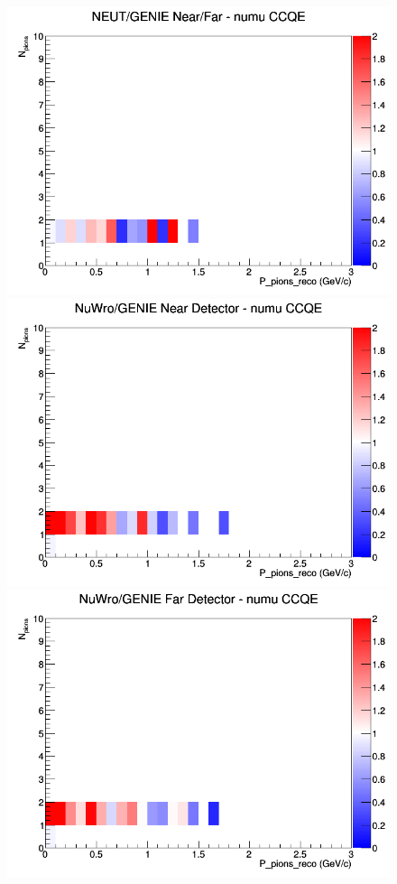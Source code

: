 \documentclass[12pt]{article}
\begin{document}
\begin{figure}[h]
\endminipage
{}
\includegraphics[width=\linewidth]{eff_N_P/GAr/pions/ratios/CCQE_NEUT_GENIE_numu_NF_N_P.png}
\endminipage
\newline
{}
\includegraphics[width=\linewidth]{eff_N_P/GAr/pions/ratios/CCQE_NuWro_GENIE_numu_near_N_P.png}
\endminipage
{}
\includegraphics[width=\linewidth]{eff_N_P/GAr/pions/ratios/CCQE_NuWro_GENIE_numu_far_N_P.png}

\end{figure}
\end{document}
